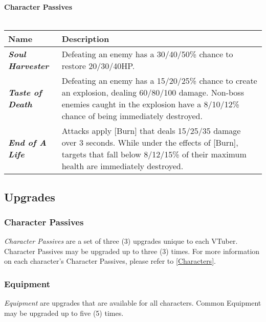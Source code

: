 \documentclass[10pt, a4paper]{article}
\begin{document}
  	\noindent\textbf{Character Passives}\\\\
  	\begin{supertabular}{p{2.7cm} p{6cm}}
  		\hline
  		\textbf{Name}                    & \textbf{Description}                                                                                                                                                                           \\ \hline
  		\textit{\textbf{Soul Harvester}} & Defeating an enemy has a 30/40/50\% chance to restore 20/30/40HP.                                                                                                                              \\
  		\textit{\textbf{Taste of Death}} & Defeating an enemy has a 15/20/25\% chance to create an explosion, dealing 60/80/100 damage. Non-boss enemies caught in the explosion have a 8/10/12\% chance of being immediately destroyed.   \\
  		\textit{\textbf{End of A Life}}  & Attacks apply {[}Burn{]} that deals 15/25/35 damage over 3 seconds. While under the effects of {[}Burn{]}, targets that fall below 8/12/15\% of their maximum health are immediately destroyed. \\ \hline
  	\end{supertabular}
  	\subsection{Upgrades} \label{Upgrades}
  	
  	\subsubsection{Character Passives}
  	
  	\textit{Character Passives} are a set of three (3) upgrades unique to each VTuber. Character Passives may be upgraded up to three (3) times. For more information on each character's Character Passives, please refer to \ref{Characters}.
  	
  	\subsubsection{Equipment}
  	
  	\textit{Equipment} are upgrades that are available for all characters. Common Equipment may be upgraded up to five (5) times.
  	
\end{document}
